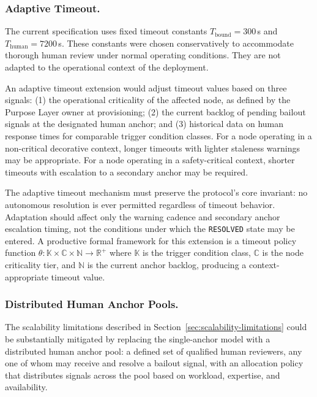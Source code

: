 \subsubsection{Adaptive Timeout.}
\label{sec:fw-adaptive-timeout}

The current specification uses fixed timeout constants $T_{\text{bound}} = 300$\,s and $T_{\text{human}} = 7200$\,s. These constants were chosen conservatively to accommodate thorough human review under normal operating conditions. They are not adapted to the operational context of the deployment.

An adaptive timeout extension would adjust timeout values based on three signals: (1) the operational criticality of the affected node, as defined by the Purpose Layer owner at provisioning; (2) the current backlog of pending bailout signals at the designated human anchor; and (3) historical data on human response times for comparable trigger condition classes. For a node operating in a non-critical decorative context, longer timeouts with lighter staleness warnings may be appropriate. For a node operating in a safety-critical context, shorter timeouts with escalation to a secondary anchor may be required.

The adaptive timeout mechanism must preserve the protocol's core invariant: no autonomous resolution is ever permitted regardless of timeout behavior. Adaptation should affect only the warning cadence and secondary anchor escalation timing, not the conditions under which the \texttt{RESOLVED} state may be entered. A productive formal framework for this extension is a timeout policy function $\theta : \mathbb{K} \times \mathbb{C} \times \mathbb{N} \rightarrow \mathbb{R}^+$ where $\mathbb{K}$ is the trigger condition class, $\mathbb{C}$ is the node criticality tier, and $\mathbb{N}$ is the current anchor backlog, producing a context-appropriate timeout value.

\subsubsection{Distributed Human Anchor Pools.}
\label{sec:fw-anchor-pools}

The scalability limitations described in Section~\ref{sec:scalability-limitations} could be substantially mitigated by replacing the single-anchor model with a distributed human anchor pool: a defined set of qualified human reviewers, any one of whom may receive and resolve a bailout signal, with an allocation policy that distributes signals across the pool based on workload, expertise, and availability.

